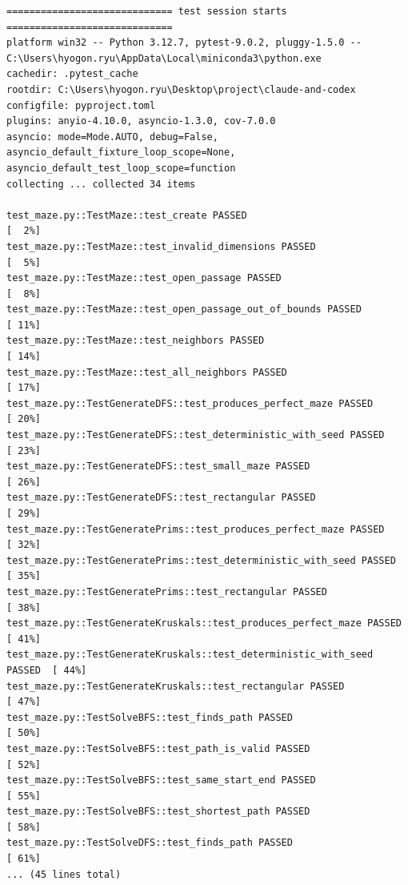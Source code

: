 \documentclass[11pt,a4paper]{article}
\begin{document}
\begin{lstlisting}
============================= test session starts =============================
platform win32 -- Python 3.12.7, pytest-9.0.2, pluggy-1.5.0 -- C:\Users\hyogon.ryu\AppData\Local\miniconda3\python.exe
cachedir: .pytest_cache
rootdir: C:\Users\hyogon.ryu\Desktop\project\claude-and-codex
configfile: pyproject.toml
plugins: anyio-4.10.0, asyncio-1.3.0, cov-7.0.0
asyncio: mode=Mode.AUTO, debug=False, asyncio_default_fixture_loop_scope=None, asyncio_default_test_loop_scope=function
collecting ... collected 34 items

test_maze.py::TestMaze::test_create PASSED                               [  2%]
test_maze.py::TestMaze::test_invalid_dimensions PASSED                   [  5%]
test_maze.py::TestMaze::test_open_passage PASSED                         [  8%]
test_maze.py::TestMaze::test_open_passage_out_of_bounds PASSED           [ 11%]
test_maze.py::TestMaze::test_neighbors PASSED                            [ 14%]
test_maze.py::TestMaze::test_all_neighbors PASSED                        [ 17%]
test_maze.py::TestGenerateDFS::test_produces_perfect_maze PASSED         [ 20%]
test_maze.py::TestGenerateDFS::test_deterministic_with_seed PASSED       [ 23%]
test_maze.py::TestGenerateDFS::test_small_maze PASSED                    [ 26%]
test_maze.py::TestGenerateDFS::test_rectangular PASSED                   [ 29%]
test_maze.py::TestGeneratePrims::test_produces_perfect_maze PASSED       [ 32%]
test_maze.py::TestGeneratePrims::test_deterministic_with_seed PASSED     [ 35%]
test_maze.py::TestGeneratePrims::test_rectangular PASSED                 [ 38%]
test_maze.py::TestGenerateKruskals::test_produces_perfect_maze PASSED    [ 41%]
test_maze.py::TestGenerateKruskals::test_deterministic_with_seed PASSED  [ 44%]
test_maze.py::TestGenerateKruskals::test_rectangular PASSED              [ 47%]
test_maze.py::TestSolveBFS::test_finds_path PASSED                       [ 50%]
test_maze.py::TestSolveBFS::test_path_is_valid PASSED                    [ 52%]
test_maze.py::TestSolveBFS::test_same_start_end PASSED                   [ 55%]
test_maze.py::TestSolveBFS::test_shortest_path PASSED                    [ 58%]
test_maze.py::TestSolveDFS::test_finds_path PASSED                       [ 61%]
... (45 lines total)
\end{lstlisting}
\end{document}

